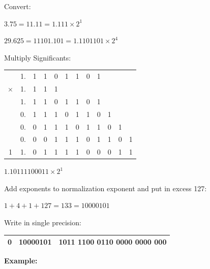     {\color{ans}
    Convert:

    $3.75=11.11=1.111\times 2^1$

    $29.625=11101.101=1.1101101\times 2^4$

    \vspace{12pt}
    Multiply Significants:

    \vspace{6pt}
    \begin{tabular}{cccccccccccc}
     &1.&1&1&0&1&1&0&1& & &  \\
$\times$&1.&1&1&1& & & & & & &  \\ \hline
     &1.&1&1&0&1&1&0&1& & &  \\
     &0.&1&1&1&0&1&1&0&1& &  \\
     &0.&0&1&1&1&0&1&1&0&1&  \\
     &0.&0&0&1&1&1&0&1&1&0&1 \\ \hline
    1&1.&0&1&1&1&1&0&0&0&1&1
    \end{tabular}

    $1.10111100011\times 2^1$

    \vspace{12pt}
    Add exponents to normalization exponent and put in excess 127:

    \vspace{6pt}
    $1+4+1+127=133=10000101$

    \vspace{12pt}
    Write in single precision:

    \vspace{6pt}
    \begin{tabular}{|c|c|c|}\hline 0 & 10000101 & 1011 1100 0110 0000 0000 000 \\ \hline \end{tabular}


    }






\vspace{.1in}\noindent
\textbf{Example:}

